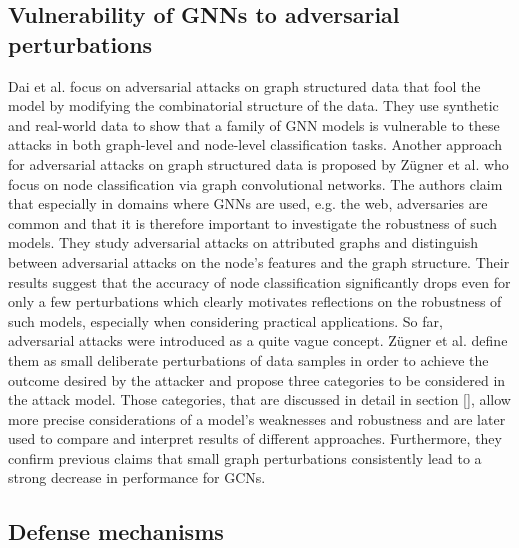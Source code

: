 \documentclass[a4paper,preprint]{sig-alternate}
\begin{document}
\subsection{Vulnerability of GNNs to adversarial perturbations}
\label{sec:rev1}

Dai et al. \cite{dai2018adversarial} focus on adversarial attacks on graph structured data that fool the model by modifying the
combinatorial structure of the data. They use synthetic and real-world data to show that a family of GNN models is vulnerable
to these attacks in both graph-level and node-level classification tasks.
Another approach for adversarial attacks on graph structured data is proposed by Zügner et al. \cite{Z_gner_2018} who focus on node classification
via graph convolutional networks.
The authors claim that especially in domains where GNNs are used, e.g. the web, adversaries are common and that it is therefore important
to investigate the robustness of such models. They study adversarial attacks on attributed graphs and distinguish between
adversarial attacks on the node's features and the graph structure. Their results suggest that the accuracy of node classification
significantly drops even for only a few perturbations which clearly motivates reflections on the robustness of such models, especially
when considering practical applications.
So far, adversarial attacks were introduced as a quite vague concept. Zügner et al. \cite{zuegner2019adversarial}
define them as small deliberate perturbations of data samples in order to achieve the outcome desired by the attacker
and propose three categories to be considered in the attack model. Those categories, that are discussed in detail in section \ref{},
allow more precise considerations of a model's weaknesses and robustness and are later used to compare and interpret results of 
different approaches. Furthermore, they confirm previous claims that small graph perturbations consistently lead to a strong decrease 
in performance for GCNs.

\subsection{Defense mechanisms}
\label{sec:rev2}
\end{document}
